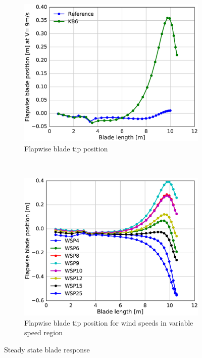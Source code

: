 \begin{figure}[tph]
\begin{subfigure}{0.50\textwidth}
\includegraphics[width=\linewidth]{figures/KB6_final/KB6_Flap_deflec_HS2.eps}
\caption{Flapwise blade tip position}
\label{subfig:KB6_flap_posn}
\end{subfigure}
 ~
\begin{subfigure}{0.50\textwidth}
\includegraphics[width=\linewidth]{figures/KB6_final/KB6_Flap_deflec_WSP_HS2.eps}
\caption{Flapwise blade tip position for wind speeds in variable speed region}
\label{subfig:KB6_flap_pson_diffwsp}
\end{subfigure}

\caption{Steady state blade response}
\label{fig:KB6_deflections}
\end{figure}

